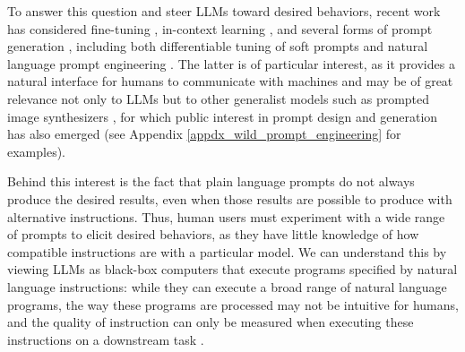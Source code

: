 To answer this question and steer LLMs toward desired behaviors, recent work has considered fine-tuning \citep{ouyang2022training,ziegler2019fine}, in-context learning \citep{brown2020language}, and several forms of prompt generation \citep{gao2021prompting}, including both differentiable tuning of soft prompts \citep{qin2021learning,lester2021power} and natural language prompt engineering \citep{reynolds2021prompt}. The latter is of particular interest, as it provides a natural interface for humans to communicate with machines and may be of great relevance not only to LLMs but to other generalist models such as prompted image synthesizers \citep{rombach2022high,ramesh2022hierarchical}, for which public interest in prompt design and generation has also emerged (see Appendix \ref{appdx_wild_prompt_engineering} for examples).

Behind this interest is the fact that plain language prompts do not always produce the desired results, even when those results are possible to produce with alternative instructions. Thus, human users must experiment with a wide range of prompts to elicit desired behaviors, as they have little knowledge of how compatible instructions are with a particular model.
We can understand this by viewing LLMs as black-box computers that execute programs specified by natural language instructions: while they can execute a broad range of natural language programs, the way these programs are processed may not be intuitive for humans, and the quality of instruction can only be measured when executing these instructions on a downstream task \citep{sanh2022multitask, wei2021finetuned}. 

